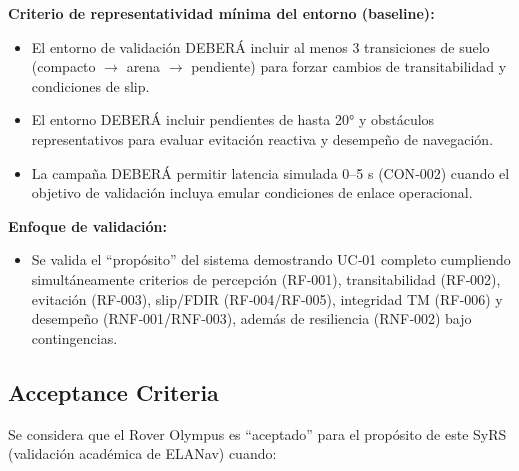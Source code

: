 \textbf{Criterio de representatividad mínima del entorno (baseline):}
\begin{itemize}
    \item El entorno de validación DEBERÁ incluir al menos 3 transiciones de suelo (compacto $\rightarrow$ arena $\rightarrow$ pendiente) para forzar cambios de transitabilidad y condiciones de slip.  
    \item El entorno DEBERÁ incluir pendientes de hasta 20° y obstáculos representativos para evaluar evitación reactiva y desempeño de navegación.  
    \item La campaña DEBERÁ permitir latencia simulada 0–5 s (CON‑002) cuando el objetivo de validación incluya emular condiciones de enlace operacional.  
\end{itemize}

\textbf{Enfoque de validación:}
\begin{itemize}
    \item Se valida el ``propósito'' del sistema demostrando UC‑01 completo cumpliendo simultáneamente criterios de percepción (RF‑001), transitabilidad (RF‑002), evitación (RF‑003), slip/FDIR (RF‑004/RF‑005), integridad TM (RF‑006) y desempeño (RNF‑001/RNF‑003), además de resiliencia (RNF‑002) bajo contingencias.
\end{itemize}

\subsection{Acceptance Criteria}

Se considera que el Rover Olympus es ``aceptado'' para el propósito de este SyRS (validación académica de ELANav) cuando:

